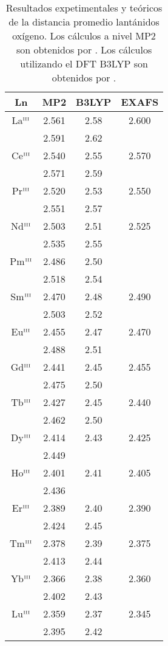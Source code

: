 \linespread{1.0}
\begin{table}[h!]
\centering
\caption{\footnotesize Resultados expetimentales y te\'oricos de la
distancia promedio lant\'anidos ox\'igeno. Los c\'alculos a nivel
MP2 son obtenidos por \cite{Ciup2010}. Los c\'alculos utilizando el 
DFT B3LYP son obtenidos por \cite{Kuta2010}.}%
\begin{tabular}{c|ccc}\hline\hline
Ln & MP2 & B3LYP & EXAFS \\ \hline
La$^{\mbox{{\tiny III}}}$  & 2.561 & 2.58 & 2.600 \\ 
                   & 2.591 & 2.62 &       \\ 
Ce$^{\mbox{{\tiny III}}}$  & 2.540 & 2.55 & 2.570 \\ 
                   & 2.571 & 2.59 &       \\ 
Pr$^{\mbox{{\tiny III}}}$  & 2.520 & 2.53 & 2.550 \\ 
                   & 2.551 & 2.57 &       \\ 
Nd$^{\mbox{{\tiny III}}}$  & 2.503 & 2.51 & 2.525 \\ 
                   & 2.535 & 2.55 &       \\ 
Pm$^{\mbox{{\tiny III}}}$  & 2.486 & 2.50 &       \\ 
                   & 2.518 & 2.54 &       \\ 
Sm$^{\mbox{{\tiny III}}}$  & 2.470 & 2.48 & 2.490 \\ 
                   & 2.503 & 2.52 &       \\ 
Eu$^{\mbox{{\tiny III}}}$  & 2.455 & 2.47 & 2.470 \\ 
                   & 2.488 & 2.51 &       \\ 
Gd$^{\mbox{{\tiny III}}}$  & 2.441 & 2.45 & 2.455 \\ 
                   & 2.475 & 2.50 &       \\ 
Tb$^{\mbox{{\tiny III}}}$  & 2.427 & 2.45 & 2.440 \\ 
                   & 2.462 & 2.50 &       \\ 
Dy$^{\mbox{{\tiny III}}}$  & 2.414 & 2.43 & 2.425 \\ 
                   & 2.449 &      &       \\ 
Ho$^{\mbox{{\tiny III}}}$  & 2.401 & 2.41 & 2.405 \\ 
                   & 2.436 &      &       \\ 
Er$^{\mbox{{\tiny III}}}$  & 2.389 & 2.40 & 2.390 \\ 
                   & 2.424 & 2.45 &       \\ 
Tm$^{\mbox{{\tiny III}}}$  & 2.378 & 2.39 & 2.375 \\ 
                   & 2.413 & 2.44 &       \\ 
Yb$^{\mbox{{\tiny III}}}$  & 2.366 & 2.38 & 2.360 \\ 
                   & 2.402 & 2.43 &       \\ 
Lu$^{\mbox{{\tiny III}}}$  & 2.359 & 2.37 & 2.345 \\ 
                   & 2.395 & 2.42 &       \\ 
\hline \end{tabular}\label{tDTyE}\end{table}
\linespread{1.75}
